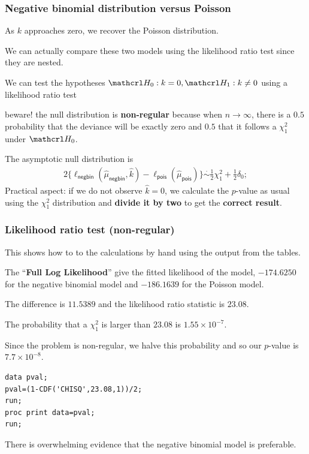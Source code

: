 \documentclass{beamer}
\begin{document}
\begin{frame}[fragile]
\frametitle{Negative binomial distribution versus Poisson}
\bi

\item As $k$ approaches zero, we recover the
Poisson distribution. 
\item We can actually compare these two models using the likelihood ratio test since they are nested. 
\item  We can test the hypotheses $\Hy_0: k=0, \Hy_1: k\neq 0$ using a likelihood ratio test
\bi \item beware! the null distribution is \textbf{non-regular} because when $n \to \infty$, there is a $0.5$ probability that the deviance will be exactly zero and $0.5$ that it follows a $\chi^2_1$ under $\Hy_0$.
\ei
\item The asymptotic null distribution is 
\begin{align*}
2\{\ell_{\mathsf{negbin}}(\hat{\mu}_{\mathsf{negbin}}, \hat{k}) - \ell_{\mathsf{pois}}(\hat{\mu}_{\mathsf{pois}})\} \stackrel{\cdot}{\sim} \frac{1}{2}\chi^2_1 + \frac{1}{2} \delta_0;
\end{align*}
Practical aspect: if we do not observe $\hat{k}=0$, we calculate the $p$-value as usual using the $\chi^2_1$ distribution and \textbf{divide it by two} to get the \textbf{correct result}.
\ei
\end{frame}
\begin{frame}[fragile]
\frametitle{Likelihood ratio test (non-regular)}
This shows how to to the calculations by hand using the output from the tables.
\bi \item The ``\textbf{Full Log Likelihood}'' give the fitted likelihood of the model, $-174.6250$ for the negative binomial model and $-186.1639$ for the Poisson model.
\item The difference is $11.5389$ and the likelihood ratio statistic is $23.08$.
\item The probability that a  $\chi^2_1$ is larger than $23.08$ is $1.55 \times 10^{-7}$.
\item Since the problem is non-regular, we halve this probability and so our $p$-value is $7.7 \times 10^{-8}$. 
\ei
\begin{tcolorbox}[colback=white, colframe=hecblue, title=SAS code for likelihood ratio test (non-regular)]
{\small 
\begin{verbatim}
data pval;
pval=(1-CDF('CHISQ',23.08,1))/2;
run;
proc print data=pval;
run;
\end{verbatim}
}
\end{tcolorbox}
{\footnotesize There is overwhelming evidence that the negative binomial model is preferable.

}

\end{frame}
\end{document}
